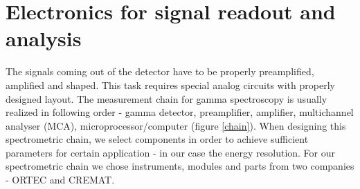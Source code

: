 
\chapter{Electronics for signal readout and analysis}
The signals coming out of the detector have to be properly preamplified, amplified and shaped. This  task requires special analog circuits with properly designed layout. 
The measurement chain for gamma spectroscopy is usually realized in following order - gamma detector, preamplifier, amplifier, multichannel analyser (MCA), microprocessor/computer (figure \ref{chain}). When designing this spectrometric chain, we select components in order to achieve sufficient parameters for certain application - in our case the energy resolution. For our spectrometric chain we chose instruments, modules and parts from two companies - ORTEC and CREMAT.


